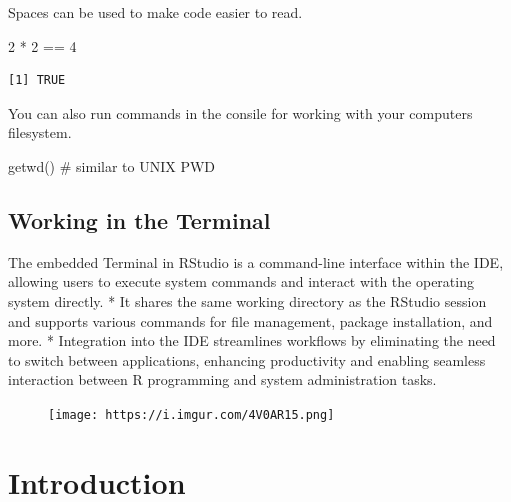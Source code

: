 \documentclass[
  letterpaper,
  DIV=11,
  numbers=noendperiod]{scrreprt}
\newenvironment{Shaded}{\begin{snugshade}}{\end{snugshade}}
\newcommand{\CommentTok}[1]{\textcolor[rgb]{0.37,0.37,0.37}{#1}}
\newcommand{\DecValTok}[1]{\textcolor[rgb]{0.68,0.00,0.00}{#1}}
\newcommand{\FunctionTok}[1]{\textcolor[rgb]{0.28,0.35,0.67}{#1}}
\newcommand{\NormalTok}[1]{\textcolor[rgb]{0.00,0.23,0.31}{#1}}
\newcommand{\SpecialCharTok}[1]{\textcolor[rgb]{0.37,0.37,0.37}{#1}}
\begin{document}
Spaces can be used to make code easier to read.

\begin{Shaded}
\begin{Highlighting}[]
\DecValTok{2} \SpecialCharTok{*} \DecValTok{2} \SpecialCharTok{==} \DecValTok{4}
\end{Highlighting}
\end{Shaded}

\begin{verbatim}
[1] TRUE
\end{verbatim}

You can also run commands in the consile for working with your computers
filesystem.

\begin{Shaded}
\begin{Highlighting}[]
\FunctionTok{getwd}\NormalTok{() }\CommentTok{\# similar to UNIX PWD}
\end{Highlighting}
\end{Shaded}

\hypertarget{working-in-the-terminal}{%
\section{Working in the Terminal}\label{working-in-the-terminal}}

The embedded Terminal in RStudio is a command-line interface within the
IDE, allowing users to execute system commands and interact with the
operating system directly. * It shares the same working directory as the
RStudio session and supports various commands for file management,
package installation, and more. * Integration into the IDE streamlines
workflows by eliminating the need to switch between applications,
enhancing productivity and enabling seamless interaction between R
programming and system administration tasks.

\begin{figure}

{\centering \texttt{[image: https://i.imgur.com/4V0AR15.png]}

}

\end{figure}


\hypertarget{introduction}{%
\chapter{Introduction}\label{introduction}}
\end{document}
